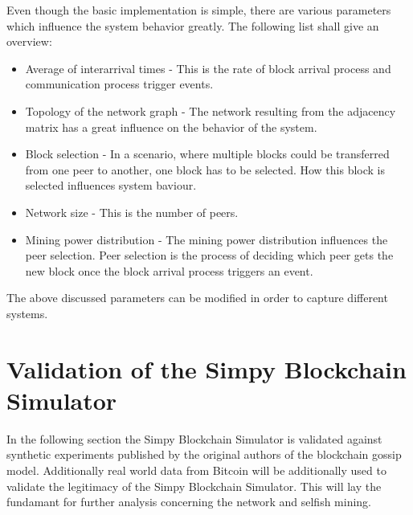 Even though the basic implementation is simple, there are various parameters which influence the system behavior greatly. The following list shall give an overview:
\begin{itemize}
\item Average of interarrival times - This is the rate of block arrival process and communication process trigger events. 
\item Topology of the network graph - The network resulting from the adjacency matrix has a great influence on the behavior of the system.
\item Block selection - In a scenario, where multiple blocks could be transferred from one peer to another, one block has to be selected. How this block is selected influences system baviour.
\item Network size - This is the number of peers.
\item Mining power distribution - The mining power distribution influences the peer selection. Peer selection is the process of deciding which peer gets the new block once the block arrival process triggers an event.
\end{itemize}
The above discussed parameters can be modified in order to capture different systems.

\section{Validation of the Simpy Blockchain Simulator}
In the following section the Simpy Blockchain Simulator is validated against synthetic experiments published by the original authors of the blockchain gossip model. Additionally real world data from Bitcoin will be additionally used to validate the legitimacy of the Simpy Blockchain Simulator. This will lay the fundamant for further analysis concerning the network and selfish mining. 
